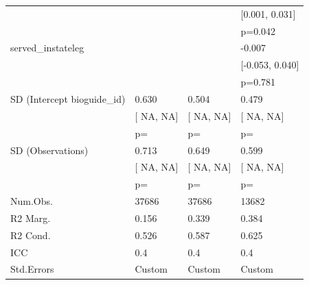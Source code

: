 \begin{tabular}{llll}
&  &  & [0.001, 0.031] \\
&  &  & p=0.042 \\
served_instateleg &  &  & -0.007 \\
&  &  & [-0.053, 0.040] \\
&  &  & p=0.781 \\
SD (Intercept bioguide_id) & 0.630 & 0.504 & 0.479 \\
& [  NA,   NA] & [  NA,   NA] & [  NA,   NA] \\
& p= & p= & p= \\
SD (Observations) & 0.713 & 0.649 & 0.599 \\
& [  NA,   NA] & [  NA,   NA] & [  NA,   NA] \\
& p= & p= & p= \\
Num.Obs. & 37686 & 37686 & 13682 \\
R2 Marg. & 0.156 & 0.339 & 0.384 \\
R2 Cond. & 0.526 & 0.587 & 0.625 \\
ICC & 0.4 & 0.4 & 0.4 \\
Std.Errors & Custom & Custom & Custom \\
\hline
\end{tabular}
